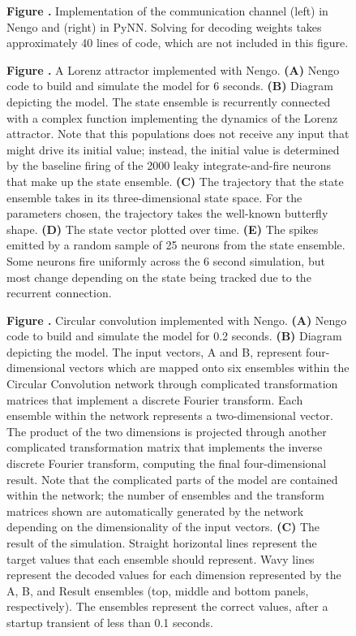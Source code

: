 \documentclass{frontiersSCNS}
\begin{document}
\begin{figure}
 \textbf{\label{fig:pynn} Figure
   .}{
   Implementation of the communication channel (left) in Nengo
   and (right) in PyNN. Solving for decoding weights
   takes approximately 40 lines of code,
   which are not included in this figure.}
\end{figure}

\begin{figure}
 \textbf{\label{fig:lorenz} Figure .}{
   A Lorenz attractor implemented with Nengo.
   \textbf{(A)} Nengo code to build and simulate the model
   for 6 seconds.
   \textbf{(B)} Diagram depicting the model. The state ensemble
   is recurrently connected with a complex function
   implementing the dynamics of the Lorenz attractor.
   Note that this populations does not receive
   any input that might drive its initial value;
   instead, the initial value is determined by
   the baseline firing of the 2000 leaky integrate-and-fire
   neurons that make up the state ensemble.
   \textbf{(C)} The trajectory that the state ensemble takes
   in its three-dimensional state space.
   For the parameters chosen, the trajectory takes
   the well-known butterfly shape.
   \textbf{(D)} The state vector plotted over time.
   \textbf{(E)} The spikes emitted by a random sample of 25
   neurons from the state ensemble.
   Some neurons fire uniformly across the 6 second simulation,
   but most change depending on the state being tracked
   due to the recurrent connection.}
\end{figure}

\begin{figure}
 \textbf{\label{fig:cconv} Figure
   .}{
   Circular convolution implemented with Nengo.
   \textbf{(A)} Nengo code to build and simulate the model
   for 0.2 seconds.
   \textbf{(B)} Diagram depicting the model.
   The input vectors, A and B, represent four-dimensional vectors
   which are mapped onto six ensembles within the
   Circular Convolution network through
   complicated transformation matrices
   that implement a discrete Fourier transform.
   Each ensemble within the network represents a
   two-dimensional vector. The product of the two dimensions
   is projected through another complicated transformation matrix
   that implements the inverse discrete Fourier transform,
   computing the final four-dimensional result.
   Note that the complicated parts of the model
   are contained within the network;
   the number of ensembles and the transform matrices shown
   are automatically generated by the network depending on
   the dimensionality of the input vectors.
   \textbf{(C)} The result of the simulation.
   Straight horizontal lines represent
   the target values that each ensemble
   should represent.
   Wavy lines represent the decoded values
   for each dimension represented by the
   A, B, and Result ensembles
   (top, middle and bottom panels, respectively).
   The ensembles represent the correct values,
   after a startup transient of less than 0.1 seconds.}
\end{figure}
\end{document}
